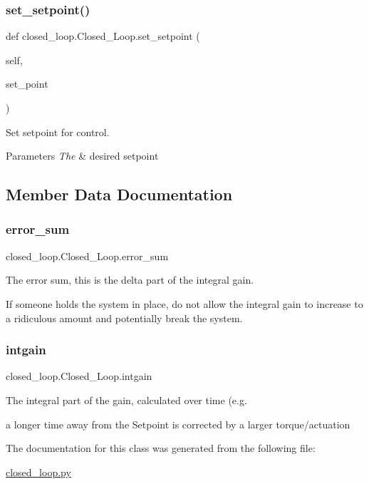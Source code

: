\subsubsection{\texorpdfstring{set\_setpoint()}{set\_setpoint()}}
{\footnotesize\ttfamily def closed\+\_\+loop.\+Closed\+\_\+\+Loop.\+set\+\_\+setpoint (\begin{DoxyParamCaption}\item[{}]{self,  }\item[{}]{set\+\_\+point }\end{DoxyParamCaption})}



Set setpoint for control. 


\begin{DoxyParams}{Parameters}
{\em The} & desired setpoint \\
\hline
\end{DoxyParams}


\subsection{Member Data Documentation}
\mbox{\label{classclosed__loop_1_1_closed___loop_a009eae11cd48d7a96b2332367efd5df2}} 
\subsubsection{\texorpdfstring{error\_sum}{error\_sum}}
{\footnotesize\ttfamily closed\+\_\+loop.\+Closed\+\_\+\+Loop.\+error\+\_\+sum}



The error sum, this is the delta part of the integral gain. 

If someone holds the system in place, do not allow the integral gain to increase to a ridiculous amount and potentially break the system. \mbox{\label{classclosed__loop_1_1_closed___loop_aca1d60310aeee998957c88ec32a8f660}} 
\subsubsection{\texorpdfstring{intgain}{intgain}}
{\footnotesize\ttfamily closed\+\_\+loop.\+Closed\+\_\+\+Loop.\+intgain}



The integral part of the gain, calculated over time (e.\+g. 

a longer time away from the Setpoint is corrected by a larger torque/actuation 

The documentation for this class was generated from the following file\+:\begin{DoxyCompactItemize}
\item 
\mbox{\hyperlink{closed__loop_8py}{closed\+\_\+loop.\+py}}\end{DoxyCompactItemize}
